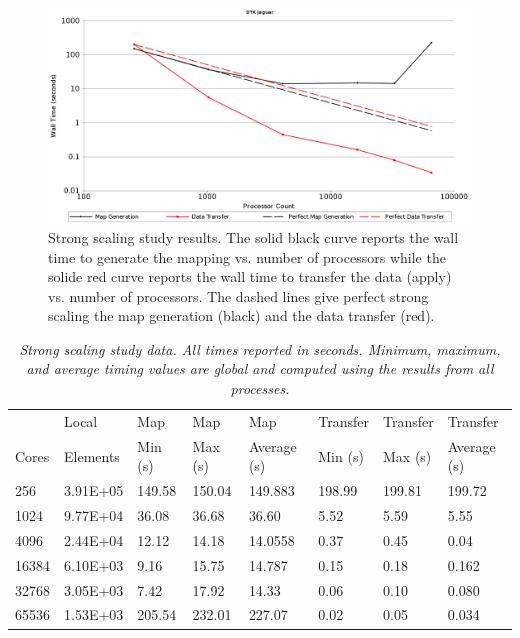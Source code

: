 \documentclass{mc2013}
\begin{document}
\begin{figure}[htpb!]
  \centering
  \includegraphics[width=5.5in]{StrongScaling.png}
  \caption{Strong scaling study results. The solid black curve reports
    the wall time to generate the mapping vs. number of processors
    while the solide red curve reports the wall time to transfer the
    data (apply) vs. number of processors. The dashed lines give
    perfect strong scaling the map generation (black) and the data
    transfer (red).}
  \label{fig:strong_scaling}
\end{figure}

\begin{table}[htpb!]
  \begin{center}
    \begin{tabular}{llllllll}\hline\hline
      \multicolumn{1}{l}{}& 
      \multicolumn{1}{l}{Local} & 
      \multicolumn{1}{l}{Map} & 
      \multicolumn{1}{l}{Map} & 
      \multicolumn{1}{l}{Map} & 
      \multicolumn{1}{l}{Transfer} & 
      \multicolumn{1}{l}{Transfer} & 
      \multicolumn{1}{l}{Transfer}\\
      \multicolumn{1}{l}{Cores} & 
      \multicolumn{1}{l}{Elements} & 
      \multicolumn{1}{l}{Min (s)} & 
      \multicolumn{1}{l}{Max (s)} & 
      \multicolumn{1}{l}{Average (s)} & 
      \multicolumn{1}{l}{Min (s)} & 
      \multicolumn{1}{l}{Max (s)} & 
      \multicolumn{1}{l}{Average (s)}\\ \hline\hline
256 &	3.91E+05 & 149.58&	150.04 & 149.883 & 198.99 & 199.81 & 199.72 \\
1024 &	9.77E+04 & 36.08 &	36.68 &	36.60 &	5.52 &	5.59 &	5.55 \\
4096 &	2.44E+04 & 12.12 &	14.18 &	14.0558 &	0.37 &	0.45 &	0.04 \\
16384 &	6.10E+03 & 9.16 &	15.75 & 14.787	& 0.15 & 0.18 &	0.162 \\
32768 &	3.05E+03 & 7.42 &	17.92 &	14.33 & 0.06 &	0.10 &	0.080 \\
65536 &	1.53E+03 & 205.54 &	232.01 & 227.07 & 0.02 & 0.05 &	0.034 \\
      \hline\hline
    \end{tabular}
  \end{center}
  \caption{\sl Strong scaling study data. All times reported in
    seconds. Minimum, maximum, and average timing values are global
    and computed using the results from all processes.}
  \label{tab:strong_scaling}
\end{table}
\end{document}
